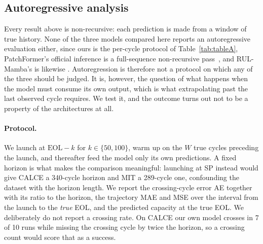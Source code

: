 
\subsection{Autoregressive analysis}
\label{sec:ar}

Every result above is non-recursive: each prediction is made from a window of
true history. None of the three models compared here reports an autoregressive
evaluation either, since ours is the per-cycle protocol of
Table~\ref{tab:tableA}, PatchFormer's official inference is a full-sequence
non-recursive pass~\cite{ref_patchformer}, and RUL-Mamba's is likewise
\cite{ref_rulmamba}. Autoregression is therefore not a protocol on which any of
the three should be judged. It is, however, the question of what happens when
the model must consume its own output, which is what extrapolating past the last
observed cycle requires. We test it, and the outcome turns out not to be a
property of the architectures at all.

\paragraph{Protocol.}
We launch at $\mathrm{EOL}-k$ for $k\in\{50,100\}$, warm up on the $W$ true
cycles preceding the launch, and thereafter feed the model only its own
predictions. A fixed horizon is what makes the comparison meaningful: launching
at SP instead would give CALCE a 340-cycle horizon and MIT a 289-cycle one,
confounding the dataset with the horizon length. We report the crossing-cycle
error AE together with its ratio to the horizon, the trajectory MAE and MSE over
the interval from the launch to the \emph{true} EOL, and the predicted capacity
at the true EOL. We deliberately do not report a crossing rate. On CALCE our own
model crosses in 7 of 10 runs while missing the crossing cycle by twice the
horizon, so a crossing count would score that as a success.

